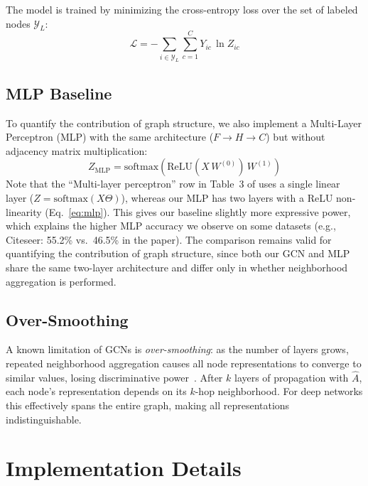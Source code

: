 \documentclass[10pt,twocolumn]{article}
\begin{document}
The model is trained by minimizing the cross-entropy loss over the set of labeled nodes $\mathcal{Y}_L$:
\begin{equation}
    \mathcal{L} = -\sum_{i \in \mathcal{Y}_L} \sum_{c=1}^{C} Y_{ic}\,\ln Z_{ic}
    \label{eq:loss}
\end{equation}

\subsection{MLP Baseline}

To quantify the contribution of graph structure, we also implement a Multi-Layer Perceptron (MLP) with the same architecture ($F \to H \to C$) but without adjacency matrix multiplication:
\begin{equation}
    Z_{\text{MLP}} = \text{softmax}\!\left(\text{ReLU}(X\,W^{(0)})\,W^{(1)}\right)
    \label{eq:mlp}
\end{equation}
Note that the ``Multi-layer perceptron'' row in Table~3 of \citet{kipf2017semi} uses a single linear layer ($Z = \text{softmax}(X\Theta)$), whereas our MLP has two layers with a ReLU non-linearity (Eq.~\ref{eq:mlp}).
This gives our baseline slightly more expressive power, which explains the higher MLP accuracy we observe on some datasets (e.g., Citeseer: 55.2\% vs.\ 46.5\% in the paper).
The comparison remains valid for quantifying the contribution of graph structure, since both our GCN and MLP share the same two-layer architecture and differ only in whether neighborhood aggregation is performed.

\subsection{Over-Smoothing}

A known limitation of GCNs is \emph{over-smoothing}: as the number of layers grows, repeated neighborhood aggregation causes all node representations to converge to similar values, losing discriminative power~\citep{li2018deeper}.
After $k$ layers of propagation with $\hat{A}$, each node's representation depends on its $k$-hop neighborhood.
For deep networks this effectively spans the entire graph, making all representations indistinguishable.

\section{Implementation Details}
\label{sec:implementation}
\end{document}
